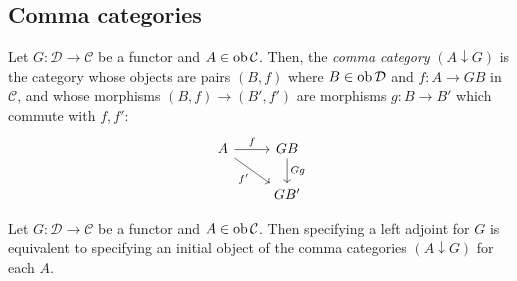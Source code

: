 \subsection{Comma categories}
\begin{definition}
    Let \( G : \mathcal D \to \mathcal C \) be a functor and \( A \in \operatorname{ob} \mathcal C \).
    Then, the \emph{comma category} \( (A \downarrow G) \) is the category whose objects are pairs \( (B, f) \) where \( B \in \operatorname{ob} \mathcal D \) and \( f : A \to GB \) in \( \mathcal C \), and whose morphisms \( (B, f) \to (B', f') \) are morphisms \( g : B \to B' \) which commute with \( f, f' \):
\[\begin{tikzcd}
	A & GB \\
	& {GB'}
	\arrow["f", from=1-1, to=1-2]
	\arrow["Gg", from=1-2, to=2-2]
	\arrow["{f'}"', from=1-1, to=2-2]
\end{tikzcd}\]
\end{definition}
\begin{theorem}
    Let \( G : \mathcal D \to \mathcal C \) be a functor and \( A \in \operatorname{ob} \mathcal C \).
    Then specifying a left adjoint for \( G \) is equivalent to specifying an initial object of the comma categories \( (A \downarrow G) \) for each \( A \).
\end{theorem}
